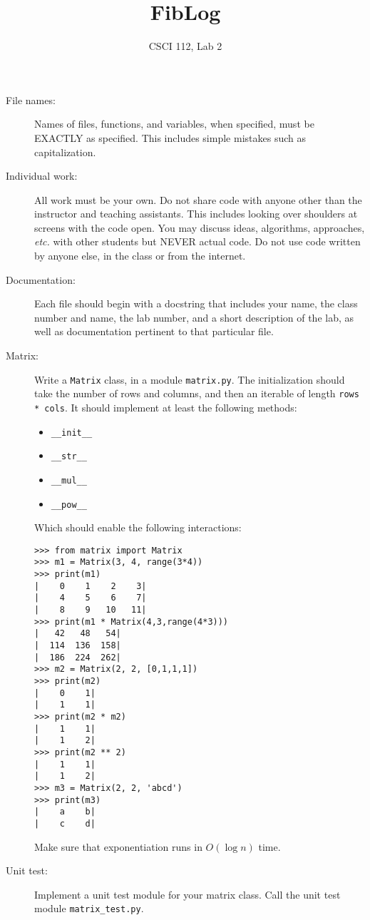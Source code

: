 \documentclass{article}
\title{FibLog}
\author{CSCI 112, Lab 2}
\date{}
\newcommand{\bi}{\begin{itemize}}
\newcommand{\li}{\item}
\newcommand{\ei}{\end{itemize}}
\begin{document}
\sloppy

\maketitle

\begin{description} 
\item[File names:]  Names of files, functions, and variables, 
when specified,
must be EXACTLY as specified.  This includes simple mistakes such
as capitalization.

\item[Individual work:]  All work must be your own.  Do not share
code with anyone other than the instructor and teaching assistants.
This includes looking over shoulders at screens with the code open.
You may discuss ideas, algorithms, approaches, {\em etc.} with
other students but NEVER actual code.  Do not use code
written by anyone else, in the class or from the internet.

\item[Documentation:] Each file should begin with a docstring
that includes your name, the class number and name, the lab
number, and  
a short description of the lab, as well as documentation pertinent
to that particular file.

\item[Matrix:]  Write a \lstinline{Matrix} class, in a module \lstinline{matrix.py}.
The initialization should take the number of rows and columns,
and then an iterable of length \lstinline{rows * cols}.
  It should 
implement at least the following methods:
\bi
\li \lstinline{__init__}
\li \lstinline{__str__}
\li \lstinline{__mul__}
\li \lstinline{__pow__}
\ei
Which should enable the following interactions:
\begin{lstlisting}
>>> from matrix import Matrix
>>> m1 = Matrix(3, 4, range(3*4))
>>> print(m1)
|    0    1    2    3|
|    4    5    6    7|
|    8    9   10   11|
>>> print(m1 * Matrix(4,3,range(4*3)))
|   42   48   54|
|  114  136  158|
|  186  224  262|
>>> m2 = Matrix(2, 2, [0,1,1,1])
>>> print(m2)
|    0    1|
|    1    1|
>>> print(m2 * m2)
|    1    1|
|    1    2|
>>> print(m2 ** 2)
|    1    1|
|    1    2|
>>> m3 = Matrix(2, 2, 'abcd')
>>> print(m3)
|    a    b|
|    c    d|
\end{lstlisting}

Make sure that exponentiation runs in $O(\log n)$ time.

\item[Unit test:]  Implement a unit test module for your matrix class. Call
the unit test module \lstinline{matrix_test.py}.


\end{description}
\end{document}
